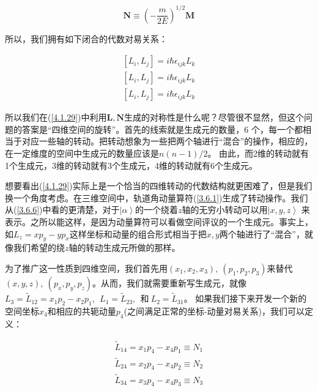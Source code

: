\documentclass[UTF8,twoside]{ctexart}
\begin{document}
\begin{equation}  \label{4.1.28}
\bm N \equiv \left(-\frac{m}{2E}\right)^{1/2}\bm M
\end{equation}

\noindent 所以，我们拥有如下闭合的代数对易关系：

\begin{subequations}  \label{4.1.29}
\begin{align}
\left[L_i, L_j\right] = i\hbar \epsilon_{ijk}L_k \\
\left[L_i, L_j\right] = i\hbar \epsilon_{ijk}L_k \\
\left[L_i, L_j\right] = i\hbar \epsilon_{ijk}L_k
\end{align}
\end{subequations}

所以我们在(\ref{4.1.29})中利用$\bm{L, N}$生成的对称性是什么呢？尽管很不显然，但这个问题的答案是“四维空间的旋转”。首先的线索就是生成元的数量，6 个，每一个都相当于对应一些轴的转动。把转动想象为一些把两个轴进行“混合”的操作，相应的，在一定维度的空间中生成元的数量应该是$n(n-1)/2$。 由此，而2维的转动就有1个生成元，3维的转动就有3个生成元，4维的转动就有6个生成元。

想要看出(\ref{4.1.29})实际上是一个恰当的四维转动的代数结构就更困难了，但是我们换一个角度考虑。在三维空间中，轨道角动量算符({\ref{3.6.1}})生成了转动操作。我们从(\ref{3.6.6})中看的更清楚，对于$\left|\alpha\right\rangle$的一个绕着$z$轴的无穷小转动可以用$\left|x, y, z\right\rangle$ 来表示。之所以能这样，是因为动量算符可以看做空间评议的一个生成元。事实上，如$L_z = xp_y - yp_x$这样坐标和动量的组合形式相当于把$x, y$两个轴进行了“混合”，就像我们希望的绕$z$轴的转动生成元所做的那样。

为了推广这一性质到四维空间，我们首先用$(x_1, x_2, x_3),\ (p_1, p_2, p_3)$来替代$(x, y, z),\ (p_x, p_y, p_z)$。从而，我们就需要重新写生成元，就像$L_3 = \tilde{L}_{12} = x_1p_2 - x_2p_1,\ \ L_1 = \tilde{L}_{23},\ \ \text{和}\ L_2 = \tilde{L}_{31}$。 如果我们接下来开发一个新的空间坐标$x_4$和相应的共轭动量$p_4$(之间满足正常的坐标-动量对易关系)，我们可以定义：

\begin{subequations}  \label{4.1.30}
\begin{align}
\tilde{L}_{14} = x_1p_4 - x_4p_1 \equiv N_1\\
\tilde{L}_{24} = x_2p_4 - x_4p_2 \equiv N_2\\
\tilde{L}_{34} = x_3p_4 - x_4p_3 \equiv N_3
\end{align}
\end{subequations}
\end{document}
